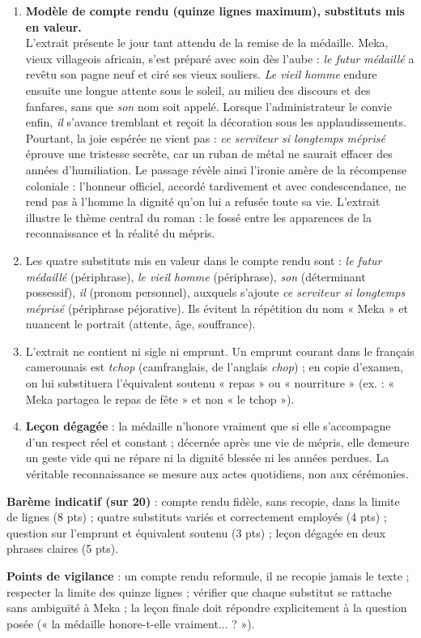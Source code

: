\documentclass[11pt]{article}
\begin{document}
\begin{corrige}
\begin{enumerate}
\item \textbf{Modèle de compte rendu (quinze lignes maximum), substituts mis en valeur.} \\
L'extrait présente le jour tant attendu de la remise de la médaille. Meka, vieux villageois africain, s'est préparé avec soin dès l'aube : \emph{le futur médaillé} a revêtu son pagne neuf et ciré ses vieux souliers. \emph{Le vieil homme} endure ensuite une longue attente sous le soleil, au milieu des discours et des fanfares, sans que \emph{son} nom soit appelé. Lorsque l'administrateur le convie enfin, \emph{il} s'avance tremblant et reçoit la décoration sous les applaudissements. Pourtant, la joie espérée ne vient pas : \emph{ce serviteur si longtemps méprisé} éprouve une tristesse secrète, car un ruban de métal ne saurait effacer des années d'humiliation. Le passage révèle ainsi l'ironie amère de la récompense coloniale : l'honneur officiel, accordé tardivement et avec condescendance, ne rend pas à l'homme la dignité qu'on lui a refusée toute sa vie. L'extrait illustre le thème central du roman : le fossé entre les apparences de la reconnaissance et la réalité du mépris.
\item Les quatre substituts mis en valeur dans le compte rendu sont : \emph{le futur médaillé} (périphrase), \emph{le vieil homme} (périphrase), \emph{son} (déterminant possessif), \emph{il} (pronom personnel), auxquels s'ajoute \emph{ce serviteur si longtemps méprisé} (périphrase péjorative). Ils évitent la répétition du nom « Meka » et nuancent le portrait (attente, âge, souffrance).
\item L'extrait ne contient ni sigle ni emprunt. Un emprunt courant dans le français camerounais est \emph{tchop} (camfranglais, de l'anglais \emph{chop}) ; en copie d'examen, on lui substituera l'équivalent soutenu « repas » ou « nourriture » (ex. : « Meka partagea le repas de fête » et non « le tchop »).
\item \textbf{Leçon dégagée} : la médaille n'honore vraiment que si elle s'accompagne d'un respect réel et constant ; décernée après une vie de mépris, elle demeure un geste vide qui ne répare ni la dignité blessée ni les années perdues. La véritable reconnaissance se mesure aux actes quotidiens, non aux cérémonies.
\end{enumerate}

\textbf{Barème indicatif (sur 20)} : compte rendu fidèle, sans recopie, dans la limite de lignes (8 pts) ; quatre substituts variés et correctement employés (4 pts) ; question sur l'emprunt et équivalent soutenu (3 pts) ; leçon dégagée en deux phrases claires (5 pts).

\textbf{Points de vigilance} : un compte rendu reformule, il ne recopie jamais le texte ; respecter la limite des quinze lignes ; vérifier que chaque substitut se rattache sans ambiguïté à Meka ; la leçon finale doit répondre explicitement à la question posée (« la médaille honore-t-elle vraiment... ? »).
\end{corrige}
\end{document}

